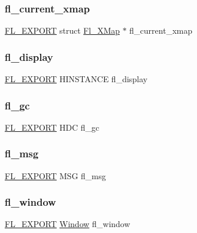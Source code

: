 \subsubsection{\texorpdfstring{fl\+\_\+current\+\_\+xmap}{fl\_current\_xmap}}
{\footnotesize\ttfamily \hyperlink{_fl___export_8_h_aa9ba29a18aee9d738370a06eeb4470fc}{F\+L\+\_\+\+E\+X\+P\+O\+RT} struct \hyperlink{struct_fl___x_map}{Fl\+\_\+\+X\+Map} $\ast$ fl\+\_\+current\+\_\+xmap}

\mbox{\label{win32_8_h_a6c6726f30a7b613184e2b315e167ddb2}} 
\subsubsection{\texorpdfstring{fl\+\_\+display}{fl\_display}}
{\footnotesize\ttfamily \hyperlink{_fl___export_8_h_aa9ba29a18aee9d738370a06eeb4470fc}{F\+L\+\_\+\+E\+X\+P\+O\+RT} H\+I\+N\+S\+T\+A\+N\+CE fl\+\_\+display}

\mbox{\label{win32_8_h_a8b858ce5708f37c90ec7f8e57263eb20}} 
\subsubsection{\texorpdfstring{fl\+\_\+gc}{fl\_gc}}
{\footnotesize\ttfamily \hyperlink{_fl___export_8_h_aa9ba29a18aee9d738370a06eeb4470fc}{F\+L\+\_\+\+E\+X\+P\+O\+RT} H\+DC fl\+\_\+gc}

\mbox{\label{win32_8_h_a46b6a1622592908edb80cb61cbb221b1}} 
\subsubsection{\texorpdfstring{fl\+\_\+msg}{fl\_msg}}
{\footnotesize\ttfamily \hyperlink{_fl___export_8_h_aa9ba29a18aee9d738370a06eeb4470fc}{F\+L\+\_\+\+E\+X\+P\+O\+RT} M\+SG fl\+\_\+msg}

\mbox{\label{win32_8_h_afdab6664143864c36ba6b51782b32500}} 
\subsubsection{\texorpdfstring{fl\+\_\+window}{fl\_window}}
{\footnotesize\ttfamily \hyperlink{_fl___export_8_h_aa9ba29a18aee9d738370a06eeb4470fc}{F\+L\+\_\+\+E\+X\+P\+O\+RT} \hyperlink{mac_8_h_a213656d363e884b651cc92f58e863fc6}{Window} fl\+\_\+window}


